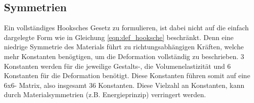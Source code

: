 \subsection{Symmetrien}
Ein vollständiges Hooksches Gesetz zu formulieren, ist dabei nicht auf die einfach dargelegte Form wie 
in Gleichung \eqref{eqn:def_hooksche} beschränkt.
Denn eine niedrige Symmetrie des Materials führt zu richtungsabhängigen Kräften, welche mehr Konstanten
benögtigen, um die Deformation vollständig zu beschrieben.
3 Konstanten werden für die jeweilige Gestalts-, die Volumenelastizität und 6 Konstanten für die Deformation benötigt.
Diese Konstanten führen somit auf eine 6x6- Matrix, also insgesamt 36 Konstanten.\newline
Diese Vielzahl an Konstanten, kann durch Materialsymmetrien (z.\;B. Energieprinzip) verringert werden.




